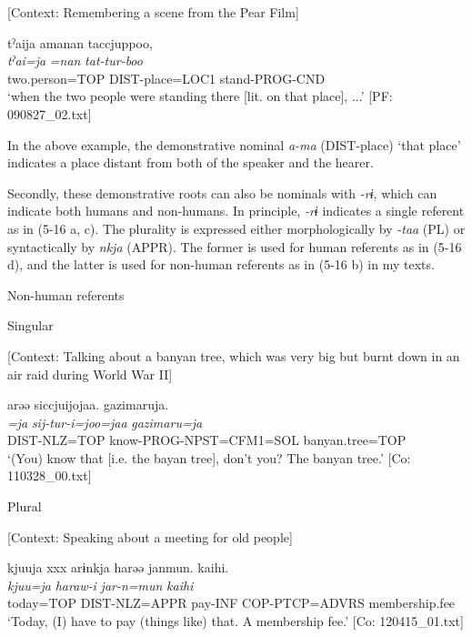 \ea \label{ex:5:15}   [Context: Remembering a scene from the Pear Film]

\glll  tˀaija  amanan  taccjuppoo,\\
\textit{tˀai=ja}  \textit{=nan}  \textit{tat-tur-boo}\\
two.person=TOP  DIST-place=LOC1  stand-PROG-CND\\
\glt ‘when the two people were standing there [lit. on that place], ...’ [PF: 090827\_02.txt]
\z

In the above example, the demonstrative nominal \textit{a-ma} (DIST-place) ‘that place’ indicates a place distant from both of the speaker and the hearer.

Secondly, these demonstrative roots can also be nominals with \textit{{}-rɨ}, which can indicate both humans and non-humans. In principle, \textit{{}-rɨ} indicates a single referent as in (5-16 a, c). The plurality is expressed either morphologically by \textit{{}-taa} (PL) or syntactically by \textit{nkja} (APPR). The former is used for human referents as in (5-16 d), and the latter is used for non-human referents as in (5-16 b) in my texts.

\ea \label{ex:5:16}   Non-human referents

 \ea \label{ex:5:16a} Singular

    [Context: Talking about a banyan tree, which was very big but burnt down in an air raid during World War II]

\glll  arəə  siccjuijojaa.  gazimaruja.\\
\textit{=ja}  \textit{sij-tur-i=joo=jaa}  \textit{gazimaru=ja}\\
DIST-NLZ=TOP  know-PROG-NPST=CFM1=SOL  banyan.tree=TOP\\
\glt ‘(You) know that [i.e. the bayan tree], don’t you? The banyan tree.’ [Co: 110328\_00.txt]

 \ex \label{ex:5:b} Plural

    [Context: Speaking about a meeting for old people]

\glll  kjuuja  xxx  arɨnkja  harəə  janmun.   {\textbar}kaihi{\textbar}.\\
\textit{kjuu=ja}    \textit{}  \textit{haraw-i}  \textit{jar-n=mun}   \textit{kaihi}\\
today=TOP    DIST-NLZ=APPR  pay-INF  COP-PTCP=ADVRS   membership.fee\\
\glt ‘Today, (I) have to pay (things like) that. A membership fee.’ [Co: 120415\_01.txt]


